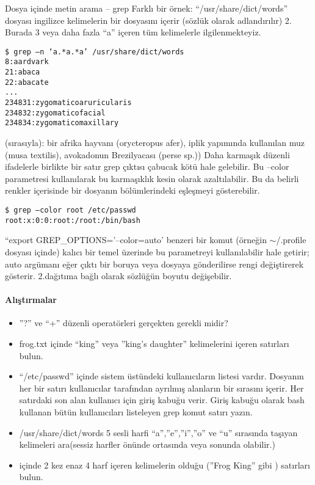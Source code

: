\documentclass[10pt,a5paper]{book}
\begin{document}
\begin{section}{Dosya içinde metin arama – grep}
Farklı bir örnek: “/usr/share/dict/words” dosyası ingilizce kelimelerin bir dosyasını içerir (sözlük olarak adlandırılır) 2. Burada 3 veya daha fazla “a”  içeren tüm kelimelerle ilgilenmekteyiz.

\begin{verbatim}
$ grep –n ‘a.*a.*a’ /usr/share/dict/words
8:aardvark
21:abaca
22:abacate
...
234831:zygomaticoaruricularis
234832:zygomaticofacial
234834:zygomaticomaxillary
\end{verbatim}

(sırasıyla): bir afrika hayvanı (orycteropus afer), iplik yapımında kullanılan muz (musa textilis), avokadonun Brezilyacası (perse sp.))
Daha karmaşık düzenli ifadelerle birlikte bir satır grep çıktısı çabucak kötü hale gelebilir. Bu –color parametresi kullanılarak bu karmaşıklık kesin olarak azaltılabilir. Bu da belirli renkler içerisinde bir dosyanın bölümlerindeki eşleşmeyi gösterebilir.
\begin{verbatim}
$ grep –color root /etc/passwd
root:x:0:0:root:/root:/bin/bash
\end{verbatim}

“export GREP\_OPTIONS='--color=auto' benzeri bir komut (örneğin $\sim$/.profile dosyası içinde) kalıcı bir temel üzerinde bu parametreyi kullanılabilir hale getirir; auto argümanı eğer çıktı bir boruya veya dosyaya gönderilirse rengi değiştirerek gösterir.
2.dağıtıma bağlı olarak sözlüğün boyutu değişebilir.

\paragraph{Alıştırmalar}{
\begin{itemize}
 \item ”?” ve “+”  düzenli operatörleri gerçekten gerekli midir?
\item frog.txt içinde “king” veya ”king’s daughter” kelimelerini içeren satırları bulun.
\item “/etc/passwd” içinde sistem üstündeki kullanıcıların listesi vardır. Dosyanın her bir satırı kullanıcılar tarafından ayrılmış alanların bir sırasını içerir. Her satırdaki son alan kullanıcı için giriş kabuğu verir. Giriş kabuğu olarak bash kullanan bütün kullanıcıları listeleyen grep komut satırı yazın.
\item /usr/share/dict/words  5 sesli harfi “a”,”e”,”i”,”o” ve “u” sırasında taşıyan kelimeleri ara(sessiz harfler önünde ortasında veya sonunda olabilir.)
\item içinde 2 kez  enaz 4 harf içeren kelimelerin olduğu (”Frog King” gibi ) satırları bulun.
\end{itemize}}


\end{section}
\end{document}
